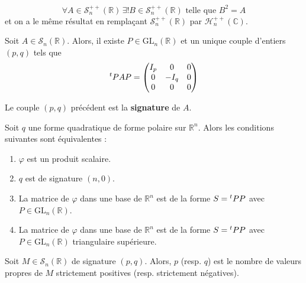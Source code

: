 	\begin{application}
		\[ \forall A \in \mathcal{S}_n^{++}(\mathbb{R}) \, \exists! B \in \mathcal{S}_n^{++}(\mathbb{R}) \text{ telle que } B^2 = A \]
		et on a le même résultat en remplaçant $\mathcal{S}_n^{++}(\mathbb{R})$ par $\mathcal{H}_n^{++}(\mathbb{C})$.
	\end{application}
	
	
	\begin{theorem}
		Soit $A \in \mathcal{S}_n(\mathbb{R})$. Alors, il existe $P \in \mathrm{GL}_n(\mathbb{R})$ et un unique couple d'entiers $(p,q)$ tels que
		\[ \mathstrut ^t PAP = \begin{pmatrix} I_p & 0 & 0 \\ 0 & -I_q & 0 \\ 0 & 0 & 0 \end{pmatrix} \]
	\end{theorem}
	
	\begin{definition}
		Le couple $(p,q)$ précédent est la \textbf{signature} de $A$.
	\end{definition}
	
	\begin{proposition}
		Soit $q$ une forme quadratique de forme polaire sur $\mathbb{R}^n$. Alors les conditions suivantes sont équivalentes :
		\begin{enumerate}[label=(\roman*)]
			\item $\varphi$ est un produit scalaire.
			\item $q$ est de signature $(n,0)$.
			\item La matrice de $\varphi$ dans une base de $\mathbb{R}^n$ est de la forme $S = \mathstrut ^t PP$ avec $P \in \mathrm{GL}_n(\mathbb{R})$.
			\item La matrice de $\varphi$ dans une base de $\mathbb{R}^n$ est de la forme $S = \mathstrut ^t PP$ avec $P \in \mathrm{GL}_n(\mathbb{R})$ triangulaire supérieure.
		\end{enumerate}
	\end{proposition}
	
	
	\begin{remark}
		Soit $M \in \mathcal{S}_n(\mathbb{R})$ de signature $(p,q)$. Alors, $p$ (resp. $q$) est le nombre de valeurs propres de $M$ strictement positives (resp. strictement négatives).
	\end{remark}
	
